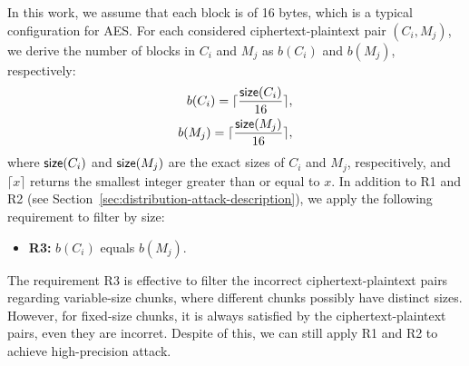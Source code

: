 

In this work, we assume that each block is of 16 bytes, which is a typical configuration for AES. For each considered ciphertext-plaintext pair $(C_i, M_j)$, we derive the number of blocks in $C_i$ and $M_j$ as $b({C_i})$ and $b({M_j})$, respectively:
\begin{eqnarray*}
b({C_i}) = \lceil \frac{{\sf size}(C_i)}{16} \rceil, \nonumber \\
b({M_j}) = \lceil \frac{{\sf size}(M_j)}{16} \rceil, \nonumber 
\end{eqnarray*}
where ${\sf size}(C_i)$ and ${\sf size}(M_j)$ are the exact sizes of $C_i$ and $M_j$, respecitively, and $\lceil x \rceil$ returns the smallest integer greater than or equal to $x$. In addition to R1 and R2 (see Section~\ref{sec:distribution-attack-description}), we apply the following requirement to filter by size:    
\begin{itemize}[leftmargin=*]
    \item {\bf R3:} $b({C_i})$ equals $b({M_j})$.
\end{itemize}

The requirement R3 is effective to filter the incorrect ciphertext-plaintext pairs regarding variable-size chunks, where different chunks possibly have distinct sizes. However, for fixed-size chunks, it is always satisfied by the ciphertext-plaintext pairs, even they are incorret. Despite of this, we can still apply R1 and R2 to achieve high-precision attack.        





